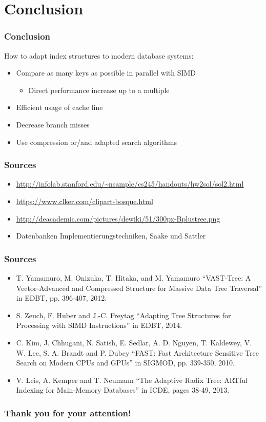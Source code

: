 \documentclass{beamer}
\begin{document}
\section{Conclusion}
\begin{frame}
\frametitle{Conclusion}
How to adapt index structures to modern database systems:
\begin{itemize}
	\item Compare as many keys as possible in parallel with SIMD
	\begin{itemize}
		\item Direct performance increase up to a multiple
	\end{itemize}
	\item Efficient usage of cache line
	\item Decrease branch misses
	\item Use compression or/and adapted search algorithms
	\end{itemize}
\end{frame}

\begin{frame}
\frametitle{Sources}
\begin{itemize}
	\item \url{http://infolab.stanford.edu/~nsample/cs245/handouts/hw2sol/sol2.html}
	\item \url{https://www.clker.com/clipart-bosque.html}
	\item \url{http://deacademic.com/pictures/dewiki/51/300px-Bplustree.png}
	\item Datenbanken Implementierungstechniken, Saake und Sattler
\end{itemize}
\end{frame}

\begin{frame}
\frametitle{Sources}
\begin{itemize}
	\item T. Yamamuro, M. Onizuka, T. Hitaka, and M. Yamamuro ``VAST-Tree: A Vector-Advanced and Compressed Structure for Massive Data Tree Traversal'' in EDBT, pp. 396-407, 2012.
	\item S. Zeuch, F. Huber and J.-C. Freytag  ``Adapting Tree Structures for Processing with SIMD Instructions'' in EDBT, 2014.
	\item C. Kim, J. Chhugani, N. Satish, E. Sedlar, A. D. Nguyen, T. Kaldewey, V. W. Lee, S. A. Brandt and P. Dubey ``FAST: Fast Architecture Sensitive Tree Search on Modern CPUs and GPUs'' in SIGMOD, pp. 339-350, 2010.
	\item V. Leis, A. Kemper and T. Neumann ``The Adaptive Radix Tree: ARTful Indexing for Main-Memory Databases'' in ICDE, pages 38-49, 2013.
\end{itemize}
\end{frame}

\begin{frame}
 \frametitle{Thank you for your attention!}
\end{frame}
\end{document}
